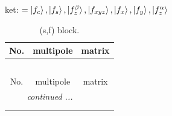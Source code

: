 \documentclass[fleqn,8pt,landscape]{jsarticle}
\begin{document}
\noindent
ket: $=\ket{f_{c}}, \ket{f_{s}}, \ket{f_{z}^{\beta}}, \ket{f_{xyz}}, \ket{f_{x}}, \ket{f_{y}}, \ket{f_{z}^{\alpha}}$
\renewcommand{\arraystretch}{1.6}
\begin{longtable}{ccc}
\caption{(s,f) block.}
 \\
 \hline \hline
No. & multipole & matrix \\ \hline \endfirsthead

\multicolumn{2}{l}{\tablename\ \thetable{}} \\
 \hline \hline
No. & multipole & matrix \\ \hline \endhead

 \hline \hline
\multicolumn{2}{r}{\footnotesize\it continued ...} \\ \endfoot

 \hline \hline
\multicolumn{2}{r}{} \\ \endlastfoot


\end{longtable}
\end{document}
